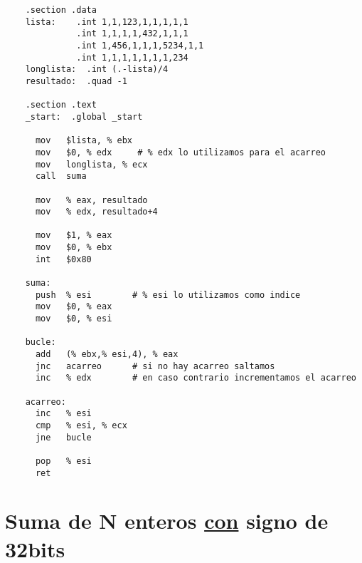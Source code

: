 \documentclass{article}
\begin{document}
  \begin{lstlisting}
    .section .data
    lista:    .int 1,1,123,1,1,1,1,1
              .int 1,1,1,1,432,1,1,1
              .int 1,456,1,1,1,5234,1,1
              .int 1,1,1,1,1,1,1,234
    longlista:	.int (.-lista)/4
    resultado:	.quad -1

    .section .text
    _start:  .global _start

      mov   $lista, % ebx
      mov   $0, % edx     # % edx lo utilizamos para el acarreo
      mov   longlista, % ecx
      call  suma

      mov   % eax, resultado
      mov   % edx, resultado+4

      mov   $1, % eax
      mov   $0, % ebx
      int   $0x80

    suma:
      push  % esi        # % esi lo utilizamos como indice
      mov   $0, % eax
      mov   $0, % esi

    bucle:
      add   (% ebx,% esi,4), % eax
      jnc   acarreo      # si no hay acarreo saltamos
      inc   % edx        # en caso contrario incrementamos el acarreo

    acarreo:
      inc   % esi
      cmp   % esi, % ecx
      jne   bucle

      pop   % esi
      ret
  \end{lstlisting}

\newpage
\section{Suma de N enteros \underline{con} signo de 32bits}
\end{document}
